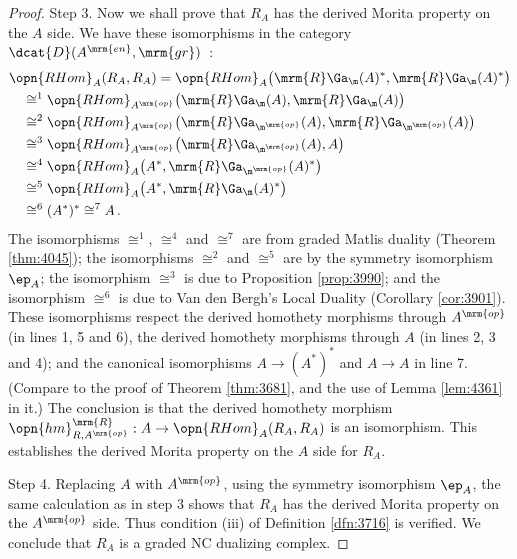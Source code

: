 \begin{proof}
\medskip \noindent Step 3.  
Now we shall prove that $R_A$ has the derived Morita property on the $A$ side. 
We have these isomorphisms in the category 
$\dcat{D}(A^{\mrm{en}}, \mrm{gr})$~:
\begin{equation} \label{eqn:3994}
\begin{aligned}
& \opn{RHom}^{}_A(R_A, R_A) = 
\opn{RHom}^{}_A \bigl( \mrm{R} \Ga_{\m}(A)^*, \mrm{R} \Ga_{\m}(A)^*
\bigr)  \\
& \quad \cong^{1}
\opn{RHom}^{}_{A^{\mrm{op}}} \bigl( \mrm{R} \Ga_{\m}(A), \mrm{R} 
\Ga_{\m}(A) \bigr) \\
& \quad \cong^2 
\opn{RHom}^{}_{A^{\mrm{op}}} 
\bigl( \mrm{R} \Ga_{\m^{\mrm{op}}}(A), \mrm{R} \Ga_{\m^{\mrm{op}}}(A) \bigr) 
\\ & \quad 
\cong^3 \opn{RHom}^{}_{A^{\mrm{op}}} 
\bigl( \mrm{R} \Ga_{\m^{\mrm{op}}}(A), A \bigr) 
\\ & \quad 
\cong^4 \opn{RHom}^{}_{A} 
\bigl( A^*, \mrm{R} \Ga_{\m^{\mrm{op}}}(A)^* \bigr) 
\\ & \quad 
\cong^5 \opn{RHom}^{}_{A} 
\bigl( A^*, \mrm{R} \Ga_{\m}(A)^* \bigr) 
\\ & \quad 
\cong^6 (A^{*})^* \cong^7 A \, .
\end{aligned}
\end{equation}
The isomorphisms $\cong^{1}$, $\cong^{4}$ and $\cong^{7}$ are from graded 
Matlis duality (Theorem \ref{thm:4045}); 
the isomorphisms $\cong^{2}$ and $\cong^{5}$ are by the symmetry isomorphism 
$\ep_A$; the isomorphism $\cong^{3}$ is due to Proposition \ref{prop:3990}; and 
the isomorphism $\cong^{6}$ is due to Van den Bergh's Local Duality (Corollary 
\ref{cor:3901}). 
These isomorphisms respect the derived homothety morphisms 
through $A^{\mrm{op}}$ (in lines 1, 5 and 6), the derived homothety morphisms
through $A$ (in lines 2, 3 and 4); and the canonical 
isomorphisms $A \to (A^*)^*$ and $A \to A$ in line 7. 
(Compare to the proof of Theorem \ref{thm:3681}, and the use of Lemma 
\ref{lem:4361} in it.)
The conclusion is that the derived homothety morphism
$\opn{hm}^{\mrm{R}}_{R, A^{\mrm{op}}} : A \to \opn{RHom}_A(R_A, R_A)$
is an isomorphism. 
This establishes the derived Morita property on the $A$ side for $R_A$. 

\medskip \noindent Step 4.
Replacing $A$ with $A^{\mrm{op}}$, using the symmetry isomorphism $\ep_A$, the 
same calculation as in step 3 shows that $R_A$ has the derived Morita property 
on the $A^{\mrm{op}}$ side. 
Thus condition (iii) of Definition \ref{dfn:3716} is verified. We conclude that 
$R_A$ is a graded NC dualizing complex. 


\end{proof}
